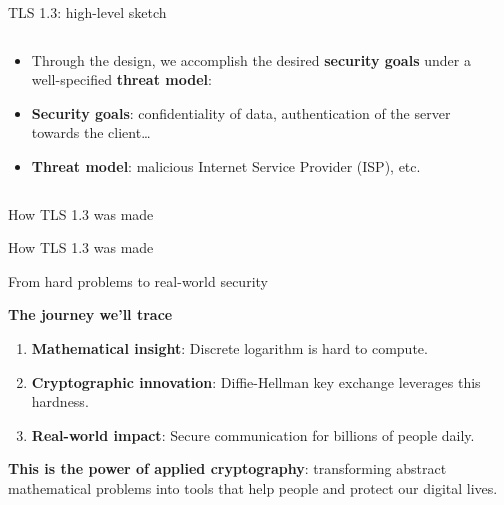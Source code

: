\documentclass[aspectratio=169, lualatex, handout]{beamer}
\begin{document}
\begin{frame}{TLS 1.3: high-level sketch}
	\begin{columns}[c]
		\begin{column}{0.5\textwidth}
			\begin{itemize}[<+->]
				\item Through the design, we accomplish the desired \textbf{security
					      goals} under a well-specified \textbf{threat model}:
				\item \textbf{Security goals}: confidentiality of data, authentication
				      of the server towards the client\ldots
				\item \textbf{Threat model}: malicious Internet Service Provider (ISP),
				      etc.
			\end{itemize}
		\end{column}

		\begin{column}{0.5\textwidth}
		\end{column}
	\end{columns}
\end{frame}

\begin{frame}{How TLS 1.3 was made}
\end{frame}

\begin{frame}{How TLS 1.3 was made}
\end{frame}

\begin{frame}{From hard problems to real-world security}
	\begin{center}
		\Large\textbf{The journey we'll trace}
	\end{center}
	\vspace{0.5cm}
	\pause
	\begin{enumerate}[<+->]
		\item \textbf{Mathematical insight}: Discrete logarithm is hard to compute.
		\item \textbf{Cryptographic innovation}: Diffie-Hellman key exchange leverages this hardness.
		\item \textbf{Real-world impact}: Secure communication for billions of people daily.
	\end{enumerate}
	\pause
	\vspace{1cm}
	\textbf{This is the power of applied cryptography}: transforming abstract mathematical problems into tools that help people and protect our digital lives.
\end{frame}
\end{document}
